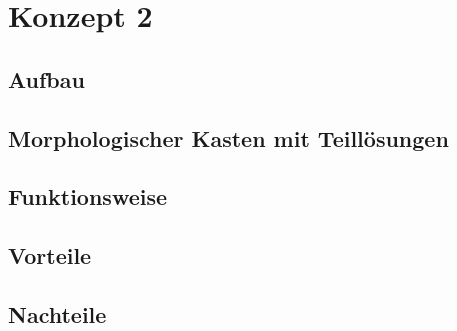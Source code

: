 \section{Konzept 2}

\subsection{Aufbau}

\subsection{Morphologischer Kasten mit Teill\"{o}sungen}

\subsection{Funktionsweise}

\subsection{Vorteile}

\subsection{Nachteile}
